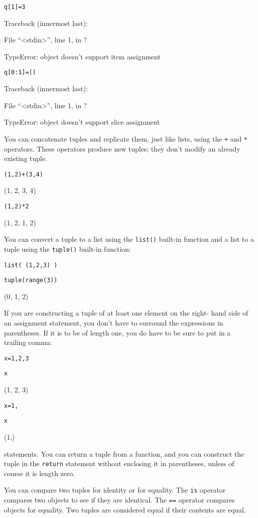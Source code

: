 \texttt{q{[}1{]}=3}

Traceback (innermost last):

 File
``\textless{}stdin\textgreater{}'', line 1, in ?

TypeError: object doesn't support
item assignment


\texttt{q{[}0:1{]}=()}

Traceback (innermost last):

 File
``\textless{}stdin\textgreater{}'', line 1, in ?

TypeError: object doesn't support
slice assignment

You can concatenate tuples and
replicate them, just like lists, using the \texttt{+} and \texttt{*}
operators. These operators produce new tuples; they don't modify an
already existing tuple.


\texttt{(1,2)+(3,4)}

(1, 2, 3, 4)


\texttt{(1,2)*2}

(1, 2, 1, 2)

You can convert a tuple to a list
using the \texttt{list()} built-in function and a list to a tuple using
the \texttt{tuple()} built-in function:


\texttt{list( (1,2,3) )}




\texttt{tuple(range(3))}

(0, 1, 2)

If you are constructing a tuple of
at least one element on the right- hand side of an assignment statement,
you don't have to surround the expressions in parentheses. If it is to
be of length one, you do have to be sure to put in a trailing comma:


\texttt{x=1,2,3}


\texttt{x}

(1, 2, 3)


\texttt{x=1,}


\texttt{x}

(1,)


statements. You can return a tuple from a function, and you can
construct the tuple in the \texttt{return} statement without enclosing it
in parentheses, unless of course it is length zero.

You can compare two tuples for
identity or for equality. The \texttt{is} operator compares two objects to
see if they are identical. The \texttt{==} operator compares objects for
equality. Two tuples are considered equal if their contents are equal.


